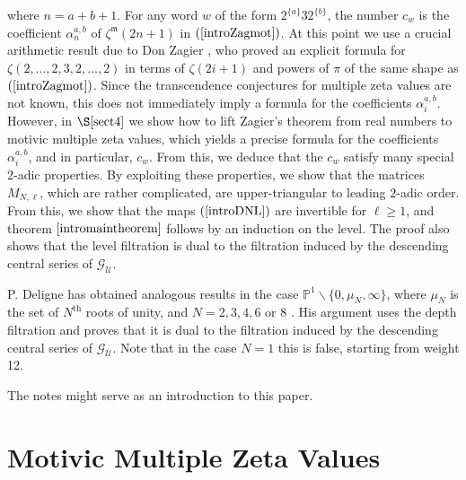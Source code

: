 \documentclass[10pt]{amsart}
\theoremstyle{definition}
\theoremstyle{remark}
\numberwithin{equation}{section}
\newcommand{\Pro}{\mathbb P}
\newcommand{\GU}{\mathcal{G}_{\mathcal{U}}}
\newcommand{\zetam}{\zeta^{ \mathfrak{m}}}
\begin{document}
where $n=a+b+1$.   For any word $w$   of the form $2^{\{a\}}32^{\{b\}}$,   the number $c_w$
is the coefficient $\alpha^{a,b}_{n}$ of    $\zetam(2n+1)$  in $(\ref{introZagmot})$.  At this point we use a crucial arithmetic result due to Don Zagier  \cite{Zagier}, 
who  proved an explicit formula for $\zeta(2,\ldots, 2, 3,2,\ldots, 2)$ 
in terms of $\zeta(2i+1)$ and powers of $\pi$ of the same shape as $(\ref{introZagmot})$. Since the transcendence conjectures for multiple zeta values are not known, this does not immediately imply a formula for the coefficients $\alpha^{a,b}_i$. However, 
in $\S\ref{sect4}$ we show how to lift Zagier's  theorem  from  real numbers  to  motivic multiple zeta values, which 
yields a  precise formula for the coefficients $\alpha^{a,b}_i$, and in particular, $c_w$.   From this, we deduce  that the $c_w$ satisfy many special $2$-adic properties. By exploiting these properties, we show that the matrices
 $M_{N,\ell}$, which are rather complicated,  are  upper-triangular to leading $2$-adic order. 
 From this, we show that the maps  $(\ref{introDNL})$ are invertible for $\ell \geq 1$, and theorem   
$\ref{intromaintheorem} $  follows by an induction on the level. The proof  also shows that the level filtration is dual to the filtration induced by  the descending central series of $\GU$. 

 
 P. Deligne has  obtained analogous results in the case $\Pro^1\backslash \{0, \mu_N,\infty\}$, where $\mu_N$ is the set of $N^{\mathrm{th}}$ roots of unity, and $N=2,3,4,6$  or $8$ 
 \cite{D}. His argument  uses the depth filtration and proves that it is dual to the filtration induced by the descending central series of $\GU$. 
  Note that  in the case $N=1$  this is false, starting from weight 12.
 
 
  The notes  \cite{Br} might serve as an introduction to this paper.



\section{Motivic Multiple Zeta Values}
\end{document}
